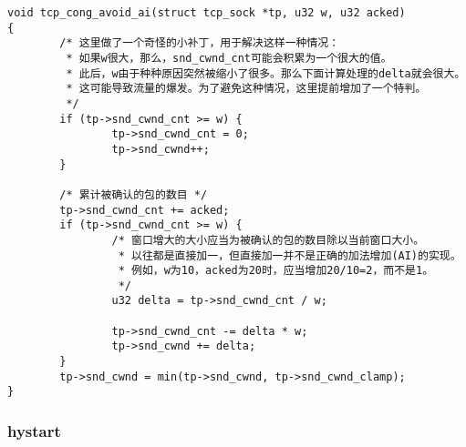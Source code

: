 \begin{verbatim}
void tcp_cong_avoid_ai(struct tcp_sock *tp, u32 w, u32 acked)
{
        /* 这里做了一个奇怪的小补丁，用于解决这样一种情况：
         * 如果w很大，那么，snd_cwnd_cnt可能会积累为一个很大的值。
         * 此后，w由于种种原因突然被缩小了很多。那么下面计算处理的delta就会很大。
         * 这可能导致流量的爆发。为了避免这种情况，这里提前增加了一个特判。
         */
        if (tp->snd_cwnd_cnt >= w) {
                tp->snd_cwnd_cnt = 0;
                tp->snd_cwnd++;
        }

        /* 累计被确认的包的数目 */
        tp->snd_cwnd_cnt += acked;
        if (tp->snd_cwnd_cnt >= w) {
                /* 窗口增大的大小应当为被确认的包的数目除以当前窗口大小。
                 * 以往都是直接加一，但直接加一并不是正确的加法增加(AI)的实现。
                 * 例如，w为10，acked为20时，应当增加20/10=2，而不是1。
                 */
                u32 delta = tp->snd_cwnd_cnt / w;

                tp->snd_cwnd_cnt -= delta * w;
                tp->snd_cwnd += delta;
        }
        tp->snd_cwnd = min(tp->snd_cwnd, tp->snd_cwnd_clamp);
}
\end{verbatim}

\subsubsection{hystart}
